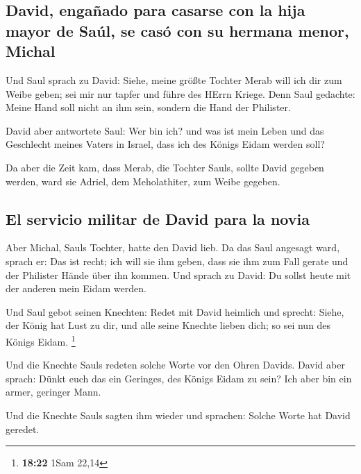 \hypertarget{david-engauxf1ado-para-casarse-con-la-hija-mayor-de-sauxfal-se-casuxf3-con-su-hermana-menor-michal}{%
\subsection{David, engañado para casarse con la hija mayor de Saúl, se
casó con su hermana menor,
Michal}\label{david-engauxf1ado-para-casarse-con-la-hija-mayor-de-sauxfal-se-casuxf3-con-su-hermana-menor-michal}}

 Und Saul sprach zu David: Siehe, meine größte Tochter
Merab will ich dir zum Weibe geben; sei mir nur tapfer und führe des
HErrn Kriege. Denn Saul gedachte: Meine Hand soll nicht an ihm sein,
sondern die Hand der Philister.

 David aber antwortete Saul: Wer bin ich? und was ist
mein Leben und das Geschlecht meines Vaters in Israel, dass ich des
Königs Eidam werden soll?

 Da aber die Zeit kam, dass Merab, die Tochter Sauls,
sollte David gegeben werden, ward sie Adriel, dem Meholathiter, zum
Weibe gegeben.

\hypertarget{el-servicio-militar-de-david-para-la-novia}{%
\subsection{El servicio militar de David para la
novia}\label{el-servicio-militar-de-david-para-la-novia}}

 Aber Michal, Sauls Tochter, hatte den David lieb. Da das
Saul angesagt ward, sprach er: Das ist recht;  ich will
sie ihm geben, dass sie ihm zum Fall gerate und der Philister Hände über
ihn kommen. Und sprach zu David: Du sollst heute mit der anderen mein
Eidam werden.

 Und Saul gebot seinen Knechten: Redet mit David heimlich
und sprecht: Siehe, der König hat Lust zu dir, und alle seine Knechte
lieben dich; so sei nun des Königs Eidam. \footnote{\textbf{18:22} 1Sam
  22,14}

 Und die Knechte Sauls redeten solche Worte vor den Ohren
Davids. David aber sprach: Dünkt euch das ein Geringes, des Königs Eidam
zu sein? Ich aber bin ein armer, geringer Mann.

 Und die Knechte Sauls sagten ihm wieder und sprachen:
Solche Worte hat David geredet.

